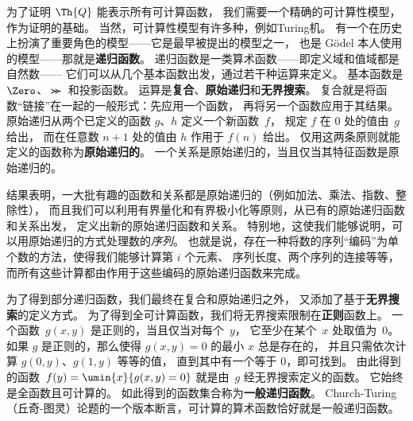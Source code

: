 为了证明 $\Th{Q}$ 能表示所有可计算函数，
我们需要一个精确的可计算性模型，作为证明的基础。
当然，可计算性模型有许多种，例如Turing机。
有一个在历史上扮演了重要角色的模型——它是最早被提出的模型之一，
也是 Gödel 本人使用的模型——那就是\textbf{递归函数}。
递归函数是一类算术函数——即定义域和值域都是自然数——
它们可以从几个基本函数出发，通过若干种运算来定义。
基本函数是 $\Zero$、$\Succ$ 和投影函数。
运算是\textbf{复合}、\textbf{原始递归}和\textbf{无界搜索}。
复合就是将函数“链接”在一起的一般形式：先应用一个函数，
再将另一个函数应用于其结果。
原始递归从两个已定义的函数 $g$、$h$ 定义一个新函数~$f$，
规定 $f$ 在 $0$ 处的值由~$g$ 给出，
而在任意数 $n+1$ 处的值由 $h$ 作用于 $f(n)$ 给出。
仅用这两条原则就能定义的函数称为\textbf{原始递归的}。
一个关系是原始递归的，当且仅当其特征函数是原始递归的。

结果表明，一大批有趣的函数和关系都是原始递归的（例如加法、乘法、指数、整除性），
而且我们可以利用有界量化和有界极小化等原则，从已有的原始递归函数和关系出发，
定义出新的原始递归函数和关系。
特别地，这使我们能够说明，可以用原始递归的方式处理数的\emph{序列}。
也就是说，存在一种将数的序列“编码”为单个数的方法，使得我们能够计算第 $i$ 个元素、
序列长度、两个序列的连接等等，
而所有这些计算都由作用于这些编码的原始递归函数来完成。

为了得到部分递归函数，我们最终在复合和原始递归之外，
又添加了基于\textbf{无界搜索}的定义方式。
为了得到全可计算函数，我们将无界搜索限制在\textbf{正则}函数上。
一个函数~$g(x, y)$ 是正则的，当且仅当对每个~$y$，
它至少在某个~$x$ 处取值为~$0$。
如果 $g$ 是正则的，那么使得 $g(x, y) = 0$ 的最小 $x$ 总是存在的，
并且只需依次计算 $g(0, y)$、$g(1, y)$ 等等的值，
直到其中有一个等于 $0$，即可找到。
由此得到的函数~$f(y) = \umin{x}{g(x, y) = 0}$ 就是由~$g$ 经无界搜索定义的函数。
它始终是全函数且可计算的。
如此得到的函数集合称为\textbf{一般递归函数}。
Church-Turing（丘奇-图灵）论题的一个版本断言，可计算的算术函数恰好就是一般递归函数。